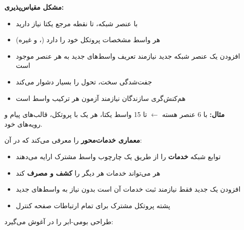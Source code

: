 \textbf{مشکل مقیاس‌پذیری:}

\begin{itemize}
\tightlist
\item
  با  عنصر شبکه، تا  نقطه مرجع یکتا نیاز دارید
\item
  هر واسط مشخصات پروتکل خود را دارد (،  و غیره)
\item
  افزودن یک عنصر شبکه جدید نیازمند تعریف واسط‌های جدید به هر عنصر موجود است
\item
  جفت‌شدگی سخت، تحول را بسیار دشوار می‌کند
\item
  هم‌کنش‌گری سازندگان نیازمند آزمون هر ترکیب واسط است
\end{itemize}

\textbf{مثال:}  با 6 عنصر هسته \ensuremath{\leftarrow} تا 15 واسط یکتا، هر یک با پروتکل، قالب‌های پیام و رویه‌های خود.


 \textbf{معماری خدمات‌محور} را معرفی می‌کند که در آن:

\begin{itemize}
\tightlist
\item
  توابع شبکه  \textbf{خدمات} را از طریق یک چارچوب واسط مشترک ارایه می‌دهند
\item
  هر  می‌تواند خدمات هر  دیگر را \textbf{کشف و مصرف} کند
\item
  افزودن یک  جدید فقط نیازمند ثبت خدمات آن است  بدون نیاز به واسط‌های جدید
\item
  پشته پروتکل مشترک  برای تمام ارتباطات صفحه کنترل
\end{itemize}



 طراحی بومی-ابر را در آغوش می‌گیرد:

